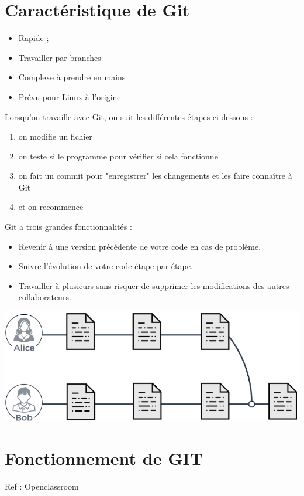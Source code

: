 \documentclass[french, 12pt]{article}%
\newcommand{\itemE}{\item[$\bullet$]}
\begin{document}
\section{Caractéristique de Git}
\begin{itemize}
\itemE Rapide ;
\itemE Travailler par branches
\itemE Complexe à prendre en mains 
\itemE Prévu pour Linux à l'origine
\end{itemize}

Lorsqu’on travaille avec Git, on suit les différentes étapes ci-dessous : 

\begin{enumerate}
\item on modifie un fichier
\item on teste si le programme pour vérifier si cela fonctionne
\item on fait un commit pour "enregistrer" les changements et les faire connaître à Git
\item et on recommence
\end{enumerate}


\vspace{0.5cm}


Git a trois grandes fonctionnalités :
\begin{itemize}
\itemE Revenir à une version précédente de votre code en cas de problème.
\itemE Suivre l’évolution de votre code étape par étape.
\itemE Travailler à plusieurs sans risquer de supprimer les modifications des autres collaborateurs. 
\end{itemize}

\begin{center}
\includegraphics[scale=0.7]{./ressource/alice_bob_git.png}
\end{center}


\section{Fonctionnement de GIT}
\tiny Ref : Openclassroom \normalsize
\end{document}
